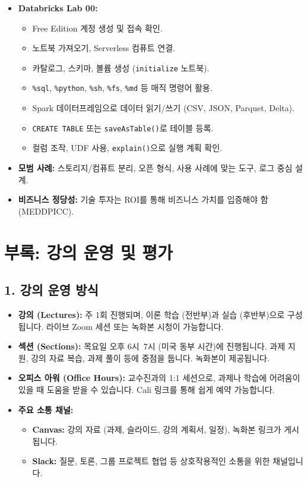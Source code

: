 \documentclass[11pt,a4paper]{article}
\theoremstyle{definition}
\begin{document}
\begin{itemize}
\begin{summarybox}
\begin{itemize}
    \item[] \textbf{Databricks Lab 00:}
    \begin{itemize}
        \item Free Edition 계정 생성 및 접속 확인.
        \item 노트북 가져오기, Serverless 컴퓨트 연결.
        \item 카탈로그, 스키마, 볼륨 생성 (\texttt{initialize} 노트북).
        \item \texttt{\%sql}, \texttt{\%python}, \texttt{\%sh}, \texttt{\%fs}, \texttt{\%md} 등 매직 명령어 활용.
        \item Spark 데이터프레임으로 데이터 읽기/쓰기 (CSV, JSON, Parquet, Delta).
        \item \texttt{CREATE TABLE} 또는 \texttt{saveAsTable()}로 테이블 등록.
        \item 컬럼 조작, UDF 사용, \texttt{explain()}으로 실행 계획 확인.
    \end{itemize}
    \item[] \textbf{모범 사례:} 스토리지/컴퓨트 분리, 오픈 형식, 사용 사례에 맞는 도구, 로그 중심 설계.
    \item[] \textbf{비즈니스 정당성:} 기술 투자는 ROI를 통해 비즈니스 가치를 입증해야 함 (MEDDPICC).
\end{itemize}
\end{summarybox}

\newpage

\section*{부록: 강의 운영 및 평가}

\subsection*{1. 강의 운영 방식}

\begin{itemize}
    \item \textbf{강의 (Lectures):} 주 1회 진행되며, 이론 학습 (전반부)과 실습 (후반부)으로 구성됩니다. 라이브 Zoom 세션 또는 녹화본 시청이 가능합니다.
    \item \textbf{섹션 (Sections):} 목요일 오후 6시~7시 (미국 동부 시간)에 진행됩니다. 과제 지원, 강의 자료 복습, 과제 풀이 등에 중점을 둡니다. 녹화본이 제공됩니다.
    \item \textbf{오피스 아워 (Office Hours):} 교수진과의 1:1 세션으로, 과제나 학습에 어려움이 있을 때 도움을 받을 수 있습니다. Cali 링크를 통해 쉽게 예약 가능합니다.
    \item \textbf{주요 소통 채널:}
    \begin{itemize}
        \item \textbf{Canvas:} 강의 자료 (과제, 슬라이드, 강의 계획서, 일정), 녹화본 링크가 게시됩니다.
        \item \textbf{Slack:} 질문, 토론, 그룹 프로젝트 협업 등 상호작용적인 소통을 위한 채널입니다.
    \end{itemize}
\end{itemize}


\end{itemize}
\end{document}
